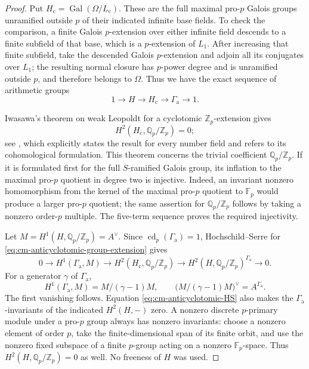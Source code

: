 \begin{proof}
Put \(H_{\mathrm c}=\operatorname{Gal}(\Omega/L_{\mathrm c})\).
These are the full maximal pro-\(p\) Galois groups unramified outside
\(p\) of their indicated infinite base fields.
To check the comparison, a finite Galois \(p\)-extension over either
infinite field descends to a finite subfield of that base,
which is a \(p\)-extension of \(L_1\).
After increasing that finite subfield, take the descended
Galois \(p\)-extension and adjoin all its conjugates over \(L_1\);
the resulting normal closure has \(p\)-power degree and is
unramified outside \(p\), and therefore belongs to \(\Omega\).
Thus we have the exact sequence of arithmetic groups
\begin{equation}\label{eq:cm-anticyclotomic-group-extension}
 1\longrightarrow H\longrightarrow H_{\mathrm c}
                 \longrightarrow\Gamma_{\mathrm a}
                 \longrightarrow1 .
\end{equation}

Iwasawa's theorem on weak Leopoldt for a cyclotomic
\(\mathbb Z_p\)-extension gives
\[
 H^2(H_{\mathrm c},\mathbb Q_p/\mathbb Z_p)=0;
\]
see \cite[Remark 4.3, author version p.~26]{VenjakobIwasawa},
which explicitly states the result for every number field and
refers to its cohomological formulation.
This theorem concerns the trivial coefficient
\(\mathbb Q_p/\mathbb Z_p\).
If it is formulated first for the full \(S\)-ramified Galois
group, its inflation to the maximal pro-\(p\) quotient in degree
two is injective.
Indeed, an invariant nonzero homomorphism from the kernel of
the maximal pro-\(p\) quotient to \(\mathbb F_p\) would produce
a larger pro-\(p\) quotient; the same assertion for
\(\mathbb Q_p/\mathbb Z_p\) follows by taking a nonzero
order-\(p\) multiple.
The five-term sequence proves the required injectivity.

Let \(M=H^1(H,\mathbb Q_p/\mathbb Z_p)=A^\vee\).
Since \(\operatorname{cd}_p(\Gamma_{\mathrm a})=1\),
Hochschild--Serre for
\eqref{eq:cm-anticyclotomic-group-extension} gives
\begin{equation}\label{eq:cm-anticyclotomic-HS}
 0\longrightarrow H^1(\Gamma_{\mathrm a},M)
 \longrightarrow H^2(H_{\mathrm c},\mathbb Q_p/\mathbb Z_p)
 \longrightarrow
 H^2(H,\mathbb Q_p/\mathbb Z_p)^{\Gamma_{\mathrm a}}
 \longrightarrow0 .
\end{equation}
For a generator \(\gamma\) of \(\Gamma_{\mathrm a}\),
\[
 H^1(\Gamma_{\mathrm a},M)=M/(\gamma-1)M,
 \qquad
 \bigl(M/(\gamma-1)M\bigr)^\vee=A^{\Gamma_{\mathrm a}}.
\]
The first vanishing follows.
Equation \eqref{eq:cm-anticyclotomic-HS} also makes the
\(\Gamma_{\mathrm a}\)-invariants of the indicated \(H^2(H,-)\)
zero.
A nonzero discrete \(p\)-primary module under a pro-\(p\) group
always has nonzero invariants: choose a nonzero element of order
\(p\), take the finite-dimensional span of its finite orbit,
and use the nonzero fixed subspace of a finite \(p\)-group
acting on a nonzero \(\mathbb F_p\)-space.
Thus \(H^2(H,\mathbb Q_p/\mathbb Z_p)=0\) as well.
No freeness of \(H\) was used.
\end{proof}

